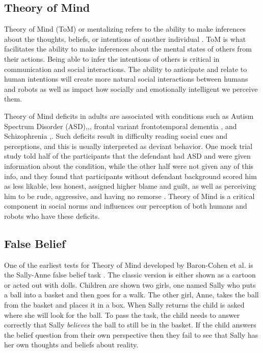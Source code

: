 \documentclass[letterpaper, 10 pt, conference]{ieeeconf}  %
\begin{document}
\subsection{Theory of Mind}
Theory of Mind (ToM) or mentalizing refers to the ability to make inferences about the thoughts, beliefs, or intentions of another individual \cite{BARONCOHEN85}. ToM is what facilitates the ability to make inferences about the mental states of others from their actions. Being able to infer the intentions of others is critical in communication and social interactions. The ability to anticipate and relate to human intentions will create more natural social interactions between humans and robots as well as impact how socially and emotionally intelligent we perceive them.

Theory of Mind deficits in adults are associated with conditions such as Autism Spectrum Disorder (ASD)\cite{ASD1},\cite{ASD2},\cite{ASD3}, frontal variant frontotemporal dementia \cite{10.1093/brain/awf079, TORRALVA2007342}, and Schizophrenia \cite{Schizophrenia},\cite{Schizophrenia2}. Such deficits result in difficulty reading social cues and perceptions, and this is usually interpreted as deviant behavior. One mock trial study told half of the participants that the defendant had ASD and were given information about the condition, while the other half were not given any of this info, and they found that participants without defendant background scored him as less likable, less honest, assigned higher blame and guilt, as well as perceiving him to be rude, aggressive, and having no remorse \cite{Maras2019}. Theory of Mind is a critical component in social norms and influences our perception of both humans and robots who have these deficits. 

\subsection{False Belief}

One of the earliest tests for Theory of Mind developed by Baron-Cohen et al. is the Sally-Anne false belief task \cite{BARONCOHEN85}. The classic version is either shown as a cartoon or acted out with dolls. Children are shown two girls, one named Sally who puts a ball into a basket and then goes for a walk. The other girl, Anne, takes the ball from the basket and places it in a box. When Sally returns the child is asked where she will look for the ball. To pass the task, the child needs to answer correctly that Sally \textit{believes} the ball to still be in the basket. If the child answers the belief question from their own perspective then they fail to see that Sally has her own thoughts and beliefs about reality.
\end{document}
